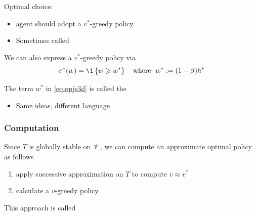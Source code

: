 \begin{frame}
    
    Optimal choice:
    \begin{itemize}
        \item agent should adopt a $v^*$-greedy policy
            \vspace{0.5em}
        \item Sometimes called 
    \end{itemize}


            \vspace{0.5em}
            \vspace{0.5em}
    We can also express a $v^*$-greedy policy via
    \begin{equation}
        \label{eq:opjs3d}
        \sigma^*(w) 
        = \1
        \left\{
            w \geq w^*
        \right\}
        \quad \text{where } \;
        w^* := (1 - \beta) h^* 
    \end{equation}

            \vspace{0.5em}
            \vspace{0.5em}
    The term $w^*$ in \eqref{eq:opjs3d} is called the 

    \begin{itemize}
        \item Same ideas, different language
    \end{itemize}

\end{frame}


\begin{frame}
    \frametitle{Computation}

    Since $T$ is globally stable on $\mathscr V$, we can compute an approximate
    optimal policy as follows

            \vspace{0.5em}
    \begin{enumerate}
        \item apply successive approximation on $T$ to compute $v \approx v^*$
            \vspace{0.5em}
        \item calculate a $v$-greedy policy
    \end{enumerate}

            \vspace{0.5em}
            \vspace{0.5em}
            \vspace{0.5em}
    This approach is called 

\end{frame}



